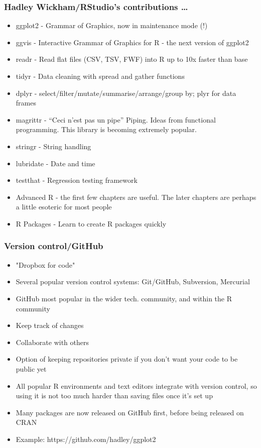 \documentclass{beamer}
\begin{document}
\begin{frame}
\frametitle{Hadley Wickham/RStudio's contributions \ldots}
\begin{itemize}
\item ggplot2 - Grammar of Graphics, now in maintenance mode (!)
\item ggvis - Interactive Grammar of Graphics for R - the next version of ggplot2
\item readr - Read flat files (CSV, TSV, FWF) into R up to 10x faster than base
\item tidyr - Data cleaning with spread and gather functions
\item dplyr - select/filter/mutate/summarise/arrange/group by; plyr for data frames
\item magrittr - ``Ceci n'est pas un pipe'' Piping. Ideas from functional programming.
			This library is becoming extremely popular.
\item stringr - String handling
\item lubridate - Date and time
\item testthat - Regression testing framework
\item Advanced R - the first few chapters are useful. The later chapters are perhaps a little
			esoteric for most people
\item R Packages - Learn to create R packages quickly
\end{itemize}
\end{frame}

\begin{frame}
\frametitle{Version control/GitHub}
\begin{itemize}
\item "Dropbox for code"
\item Several popular version control systems: Git/GitHub, Subversion, Mercurial
\item GitHub most popular in the wider tech. community, and within the R community
\item Keep track of changes
\item Collaborate with others
\item Option of keeping repositories private if you don't want your code to be public yet
\item All popular R environments and text editors integrate with version control, so using it
			is not too much harder than saving files once it's set up
\item Many packages are now released on GitHub first, before being released on CRAN
\item Example: https://github.com/hadley/ggplot2
\end{itemize}
\end{frame}
\end{document}
